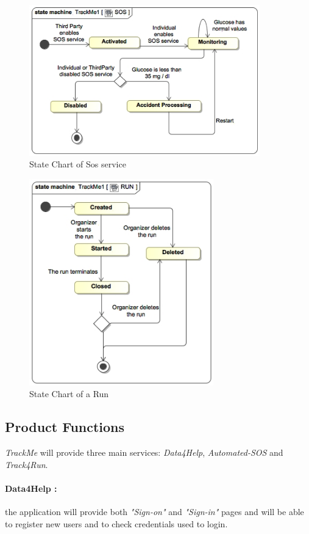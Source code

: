\documentclass[a4paper]{article}
\begin{document}
    \begin{figure}[!htpb]
        \centering
        \includegraphics[width=100mm, keepaspectratio]{images/UML/state_sos.jpg}
        \caption{State Chart of Sos service}
    \end{figure}
    
    \begin{figure}[!htpb]
        \centering
        \includegraphics[width=80mm, keepaspectratio]{images/UML/state_run.jpg}
        \caption{State Chart of a Run}
    \end{figure}
    
    \newpage
    
    \subsection{Product Functions}
    \textit{TrackMe} will provide three main services: \textit{Data4Help}, \textit{Automated-SOS} and \textit{Track4Run}.
    
    \paragraph{Data4Help :}
    the application will provide both \textit{"Sign-on"} and \textit{"Sign-in"} pages and will be able to register new users and to check credentials used to login.
    
\end{document}
